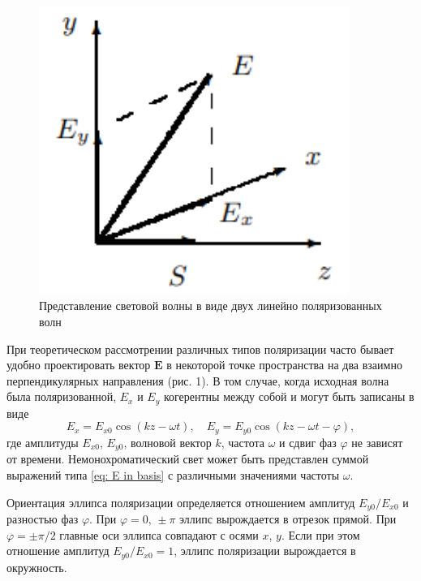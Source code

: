 \documentclass[a4paper,12pt]{article}
\begin{document}
\begin{figure}\label{fig: E in basis}
    \begin{center}
    \vspace{-20pt}
        \includegraphics[width = 0.9\textwidth]{E_in_basis.png}
    \end{center}
    \caption{Представление световой волны в виде двух линейно поляризованных волн}
\end{figure}
При теоретическом рассмотрении различных типов поляризации часто бывает удобно проектировать вектор $\mathbf{E}$ в некоторой точке пространства на два взаимно перпендикулярных направления (рис. 1). В том случае, когда исходная волна была поляризованной, $E_x$ и $E_y$ когерентны между собой и могут быть записаны в виде
\begin{equation}\label{eq: E in basis}
    E_x = E_{x0}\cos(kz - \omega t), \quad
    E_y = E_{y0}\cos(kz - \omega t - \varphi),
\end{equation}
где амплитуды $E_{x0}$, $E_{y0}$, волновой вектор $k$, частота $\omega$ и сдвиг фаз $\varphi$ не зависят от времени. Немонохроматический свет может быть представлен суммой выражений типа \eqref{eq: E in basis} с различными значениями частоты $\omega$. 

Ориентация эллипса поляризации определяется отношением амплитуд $E_{y0} / E_{x0}$ и разностью фаз $\varphi$. При $\varphi = 0\text{, } \pm\pi$ эллипс вырождается в отрезок прямой. При $\varphi = \pm \pi / 2$ главные оси эллипса совпадают с осями $x$, $y$. Если при этом отношение амплитуд $E_{y0} / E_{x0} = 1$, эллипс поляризации вырождается в окружность.
\end{document}
